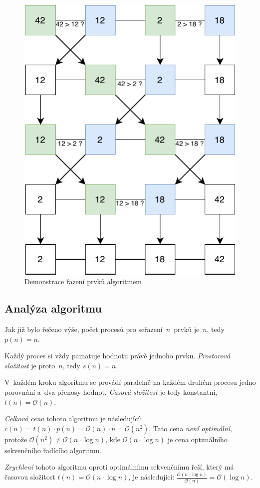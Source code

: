 \documentclass[a4paper, 10pt, twocolumn]{article}
\begin{document}
    \begin{figure}[ht]
        \centering
        \includegraphics[width=.6 \linewidth]{img/algorithm-demo.pdf}
        \caption{Demonstrace řazení prvků algoritmem}
		\label{fig:algorithm-demo}
    \end{figure}

    \subsection{Analýza algoritmu}

    Jak již bylo řečeno výše, počet procesů pro seřazení~$ n $~prvků
    je~$ n $, tedy $ p(n) = n $.

    Každý proces si vždy pamatuje hodnotu právě jednoho prvku.
    \emph{Prostorová složitost} je proto~$ n $, tedy $ s(n) = n $.

    V~každém kroku algoritmu se provádí paralelně na každém druhém procesu
    jedno porovnání a~dva přenosy hodnot. \emph{Časová složitost} je tedy
    konstantní, $ t(n) = \mathcal{O}(n) $.

    \emph{Celková cena} tohoto algoritmu je následující: $ c(n) = t(n) \cdot
    p(n) = \mathcal{O}(n) \cdot n = \mathcal{O}(n^2) $. Tato cena
    \emph{není optimální}, protože $ \mathcal{O}(n^2) \neq \mathcal{O}(
    n \cdot \log n) $, kde $ \mathcal{O}(n \cdot \log n) $ je cena
    optimálního sekvenčního řadícího algoritmu.

    \emph{Zrychlení} tohoto algoritmu oproti optimálnímu sekvenčnímu řeší,
    který má časovou složitost $ t(n) = \mathcal{O}(n \cdot \log n) $, je
    následující: $ \frac{\mathcal{O}(n \cdot \log n)}{\mathcal{O}(n)} =
    \mathcal{O}(\log n) $.
\end{document}
